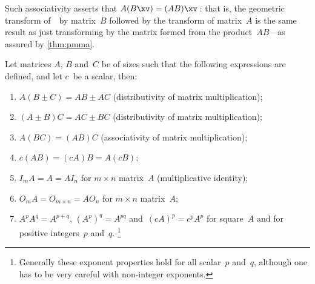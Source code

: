 \begin{example}
{}%
Such associativity asserts that \(A(B\xv)=(AB)\xv\)\,: that is, the geometric transform of~\xv\ by matrix~\(B\) followed by the transform of matrix~\(A\) is the same result as just transforming by the matrix formed from the product~\(AB\)---as assured by \autoref{thm:pmma}.
\end{example}



\begin{theorem} \label{thm:pmm}
Let matrices \(A\), \(B\) and~\(C\) be of sizes such that the following expressions are defined, and let \(c\)~be a scalar, then:
\begin{enumerate}
\item\label{thm:pmmb} \(A(B\pm C)=AB\pm AC\) (distributivity of matrix multiplication);
\item\label{thm:pmmbb} \((A\pm B)C=AC\pm BC\) (distributivity of matrix multiplication);
\item\label{thm:pmma} \(A(BC)=(AB)C\) (associativity of matrix multiplication);
\item\label{thm:pmmc} \(c(AB)=(cA)B=A(cB)\);
\item\label{thm:pmmd} \(I_mA=A=AI_n\) for \(m\times n\) matrix~\(A\) (multiplicative identity);
\item\label{thm:pmme} \(O_mA=O_{m\times n}=AO_n\)  for \(m\times n\) matrix~\(A\);
\item\label{thm:pmmg} \(A^pA^q=A^{p+q}\), \((A^p)^q=A^{pq}\) and~\((cA)^p=c^pA^p\) for square~\(A\) and for positive integers~\(p\) and~\(q\).
\footnote{Generally these exponent properties hold for all scalar~\(p\) and~\(q\), although one has to be very careful with non-integer exponents.}
\end{enumerate}
\end{theorem}

